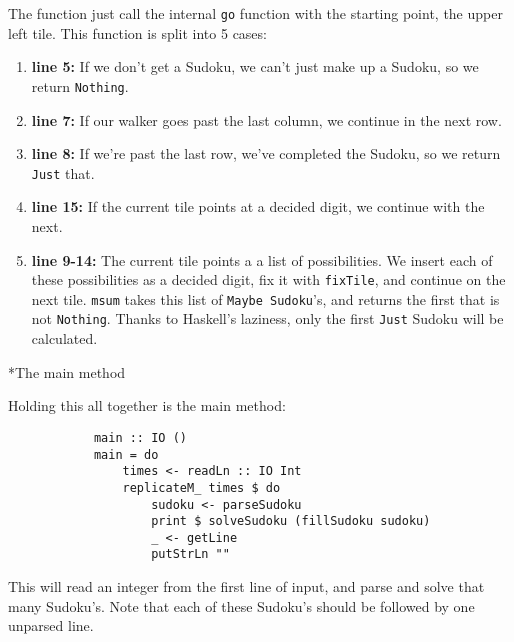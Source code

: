 \documentclass[a4paper,12pt]{article}
\begin{document}
\begin{section}
\begin{subsection}
\begin{subsubsection}
            The function just call the internal \texttt{go} function with the
            starting point, the upper left tile. This function is split into 5
            cases:
            \begin{enumerate}
                \item \textbf{line 5:} If we don't get a Sudoku, we can't just
                    make up a Sudoku, so we return \texttt{Nothing}.
                \item \textbf{line 7:} If our walker goes past the last column,
                    we continue in the next row.
                \item \textbf{line 8:} If we're past the last row, we've
                    completed the Sudoku, so we return \texttt{Just} that.
                \item \textbf{line 15:} If the current tile points at a decided
                    digit, we continue with the next.
                \item \textbf{line 9-14:} The current tile points a a list of
                    possibilities. We insert each of these possibilities as a
                    decided digit, fix it with \texttt{fixTile}, and continue on
                    the next tile. \texttt{msum} takes this list of
                    \texttt{Maybe Sudoku}'s, and returns the first that is not
                    \texttt{Nothing}. Thanks to Haskell's laziness, only the
                    first \texttt{Just} Sudoku will be calculated.
            \end{enumerate}
            
        \end{subsubsection}

        
        \begin{subsubsection}*{The main method}

            Holding this all together is the main method:
            \begin{lstlisting}
            main :: IO ()
            main = do
                times <- readLn :: IO Int
                replicateM_ times $ do
                    sudoku <- parseSudoku
                    print $ solveSudoku (fillSudoku sudoku)
                    _ <- getLine
                    putStrLn ""
            \end{lstlisting}

            This will read an integer from the first line of input, and parse
            and solve that many Sudoku's. Note that each of these Sudoku's
            should be followed by one unparsed line.


\end{subsubsection}
\end{subsection}
\end{section}
\end{document}
